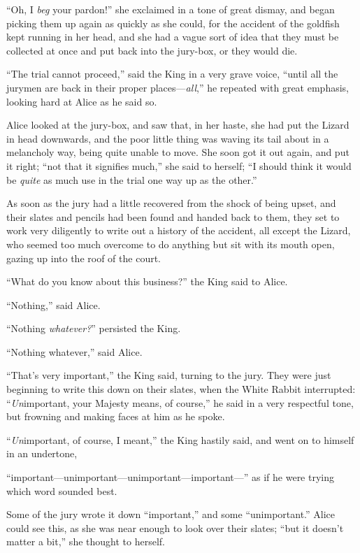 \documentclass[11pt,openany,oneside]{book}
\begin{document}
“Oh, I {\em beg\/} your pardon!” she exclaimed in a tone of great dismay, and began picking them up again as quickly as she could, for the accident of the goldfish kept running in her head, and she had a vague sort of idea that they must be collected at once and put back into the jury-box, or they would die. 

“The trial cannot proceed,” said the King in a very grave voice, “until all the jurymen are back in their proper places—{\em all\/},” he repeated with great emphasis, looking hard at Alice as he said so. 

Alice looked at the jury-box, and saw that, in her haste, she had put the Lizard in head downwards, and the poor little thing was waving its tail about in a melancholy way, being quite unable to move. She soon got it out again, and put it right; “not that it signifies much,” she said to herself; “I should think it would be {\em quite\/} as much use in the trial one way up as the other.” 

As soon as the jury had a little recovered from the shock of being upset, and their slates and pencils had been found and handed back to them, they set to work very diligently to write out a history of the accident, all except the Lizard, who seemed too much overcome to do anything but sit with its mouth open, gazing up into the roof of the court. 

“What do you know about this business?” the King said to Alice. 

“Nothing,” said Alice. 

“Nothing {\em whatever?\/}” persisted the King. 

“Nothing whatever,” said Alice. 

“That’s very important,” the King said, turning to the jury. They were just beginning to write this down on their slates, when the White Rabbit interrupted: “{\em Un\/}important, your Majesty means, of course,” he said in a very respectful tone, but frowning and making faces at him as he spoke. 

“{\em Un\/}important, of course, I meant,” the King hastily said, and went on to himself in an undertone, 

“important—unimportant—unimportant—important—” as if he were trying which word sounded best. 

Some of the jury wrote it down “important,” and some “unimportant.” Alice could see this, as she was near enough to look over their slates; “but it doesn’t matter a bit,” she thought to herself. 
\end{document}
